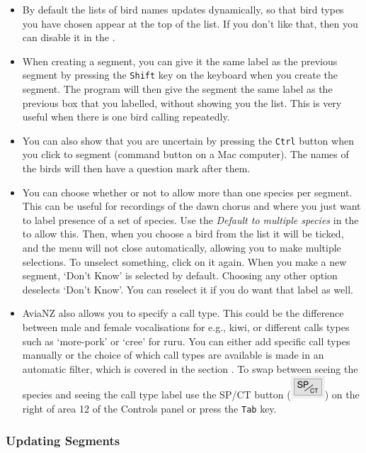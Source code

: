 \documentclass{scrartcl}
\begin{document}
\begin{itemize}
	\item By default the lists of bird names updates dynamically, so that bird types you have chosen appear at the top of the list.
		If you don't like that, then you can disable it in the \textit{}. 
	\item When creating a segment, you can give it the same label as the previous segment by pressing the \texttt{Shift} key on the keyboard when you create the segment.
		The program will then give the segment the same label as the previous box that you labelled, without showing you the list.
		This is very useful when there is one bird calling repeatedly.
	\item You can also show that you are uncertain by pressing the \texttt{Ctrl} button when you click to segment (command button on a Mac computer).
		The names of the birds will then have a question mark after them.
	\item You can choose whether or not to allow more than one species per segment.
		This can be useful for recordings of the dawn chorus and where you just want to label presence of a set of species.
		Use the \textit{Default to multiple species} in the \textit{} to allow this.
		Then, when you choose a bird from the list it will be ticked, and the menu will not close automatically, allowing you to make multiple selections.
		To unselect something, click on it again.
		When you make a new segment, `Don't Know' is selected by default.
		Choosing any other option deselects `Don't Know'.
		You can reselect it if you do want that label as well. 
	\item AviaNZ also allows you to specify a call type.
		This could be the difference between male and female vocalisations for e.g., kiwi, or different calls types such as `more-pork' or `cree' for ruru.
		You can either add specific call types manually or the choice of which call types are available is made in an automatic filter, which is covered in the section .
		To swap between seeing the species and seeing the call type label use the SP/CT button (\includegraphics[scale=0.5]{Figures/SPCT}) on the right of area 12 of the Controls panel or press the \texttt{Tab} key.

\end{itemize}

\subsubsection*{Updating Segments}
\end{document}

